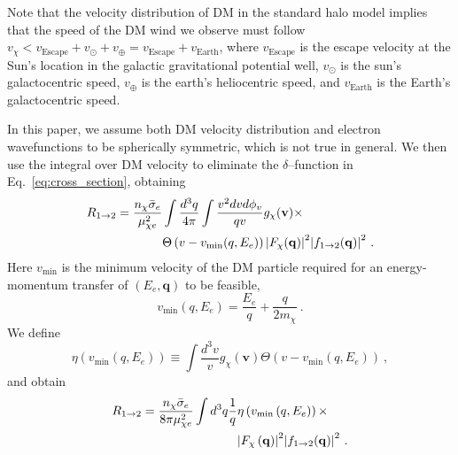 \documentclass[
    prd, twocolumn, superscriptaddress, nofootinbib, amsmath, amssymb,
    aps, floatfix,preprintnumbers
]{revtex4-2}
\begin{document}
        Note that the velocity distribution of DM in the standard halo model implies that the speed of the DM wind we observe must follow $v_\chi < v_\mathrm{Escape} + v_\odot + v_\oplus = v_\mathrm{Escape} + v_\mathrm{Earth}$, where $v_\mathrm{Escape}$ is the escape velocity at the Sun's location in the galactic gravitational potential well, $v_\odot$ is the sun's galactocentric speed, $v_\oplus$ is the earth's heliocentric speed, and $v_\mathrm{Earth}$ is the Earth's galactocentric speed.
        
        In this paper, we assume both DM velocity distribution and electron wavefunctions to be spherically symmetric, which is not true in general. We then use the integral over DM velocity to eliminate the $\delta$--function in Eq.~\eqref{eq:cross_section}, obtaining 
        \begin{equation}
            \begin{split}
                R_{1\rightarrow2} = \frac{n_\chi \Bar{\sigma}_e}{\mu_{\chi e}^2}&\int\frac{d^3 q}{4\pi}\int\frac{v^2 dv d\phi_v}{qv}g_\chi(\mathbf{v})\times \\
                &\Theta\left(v - v_\mathrm{min}(q, E_e)\right)\abs{F_\chi (\mathbf{q})}^2 \abs{f_{1\rightarrow2}(\mathbf{q})}^2\ .
            \end{split}
        \end{equation}
        Here $v_\mathrm{min}$ is the minimum velocity of the DM particle required for an energy-momentum transfer of $(E_e, \mathbf{q})$ to be feasible, 
        \begin{equation}
            v_\mathrm{min}(q, E_e) = \frac{E_e}{q} + \frac{q}{2m_\chi}\ .
        \end{equation}
        We define
        \begin{equation}
            \eta\left(v_\mathrm{min}(q, E_e)\right) \equiv \int \frac{d^3v}{v}g_\chi(\mathbf{v})\Theta\left(v - v_\mathrm{min}(q, E_e)\right)\ ,
        \end{equation}
        and obtain
        \begin{equation}\label{eq:rate_in_halo}
            \begin{split}
                R_{1\rightarrow2} = \frac{n_\chi \Bar{\sigma}_e}{8\pi\mu_{\chi e}^2}\int d^3 q \frac{1}{q} &\eta\left(v_\mathrm{min}\left(q, E_e\right)\right)\times\\
                &\abs{F_\chi\left(\mathbf{q}\right)}^2\abs{f_{1\rightarrow2}(\mathbf{q})}^2\ .
            \end{split}
        \end{equation}
        
\end{document}
